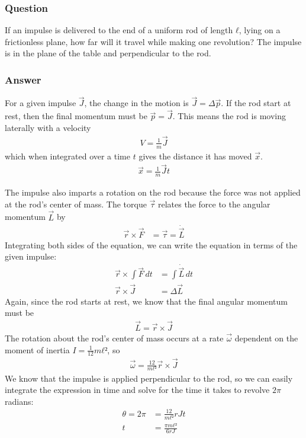 \subsubsection{Question}

If an impulse is delivered to the end of a uniform rod of length $ℓ$, lying on
a frictionless plane, how far will it travel while making one revolution? The
impulse is in the plane of the table and perpendicular to the rod.

\subsubsection{Answer}

For a given impulse $\vec J$, the change in the motion is $\vec J = Δ\vec p$.
If the rod start at rest, then the final momentum must be $\vec p = \vec J$.
This means the rod is moving laterally with a velocity
\begin{align*}
    V = \frac 1m \vec J
\end{align*}
which when integrated over a time $t$ gives the distance it has moved $\vec x$.
\begin{align*}
    \vec x = \frac 1m \vec J t
\end{align*}

The impulse also imparts a rotation on the rod because the force was not
applied at the rod's center of mass. The torque $\vec τ$ relates the force
to the angular momentum $\vec L$ by
\begin{align*}
    \vec r × \vec F &= \vec τ = \dot{\vec L}
\end{align*}
Integrating both sides of the equation, we can write the equation in terms of
the given impulse:
\begin{align*}
    \vec r × \int \vec F \,dt &= \int \dot{\vec L} \,dt \\
    \vec r × \vec J &= Δ\vec L
\end{align*}
Again, since the rod starts at rest, we know that the final angular momentum
must be
\begin{align*}
    \vec L = \vec r × \vec J
\end{align*}
The rotation about the rod's center of mass  occurs at a rate $\vec ω$
dependent on the moment of inertia $I = \frac{1}{12} mℓ²$, so
\begin{align*}
    \vec ω = \frac{12}{mℓ²} \vec r × \vec J
\end{align*}
We know that the impulse is applied perpendicular to the rod, so we can easily
integrate the expression in time and solve for the time it takes to revolve
$2π$ radians:
\begin{align*}
    θ = 2π &= \frac{12}{mℓ²} rJt \\
    t &= \frac{πmℓ²}{6 rJ}
\end{align*}

